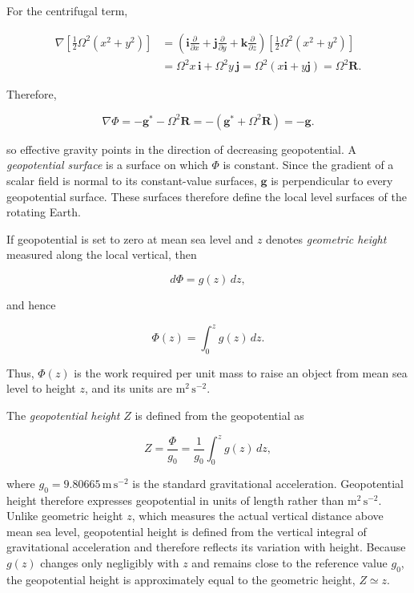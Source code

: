 \documentclass[10pt,twocolumn]{memoir}
\begin{document}
For the centrifugal term,

\begin{equation}
\begin{aligned}
    \nabla\left[\frac{1}{2}\Omega^2(x^2+y^2)\right]
    &= \left(\mathbf{i}\frac{\partial}{\partial x}+\mathbf{j}\frac{\partial}{\partial y}+\mathbf{k}\frac{\partial}{\partial z}\right)
    \left[\frac{1}{2}\Omega^2(x^2+y^2)\right] \\
    &= \Omega^2x\,\mathbf{i}+\Omega^2y\,\mathbf{j}
    = \Omega^2\left(x\mathbf{i}+y\mathbf{j}\right)
    = \Omega^2\mathbf{R}.
\end{aligned}
\end{equation}

Therefore,

\begin{equation}
    \nabla\Phi = -\mathbf{g}^* - \Omega^2\mathbf{R} = -\left(\mathbf{g}^* + \Omega^2\mathbf{R}\right) = -\mathbf{g}.
\end{equation}

so effective gravity points in the direction of decreasing geopotential. A \textit{geopotential surface} is a surface on which $\Phi$ is constant. Since the gradient of a scalar field is normal to its constant-value surfaces, $\mathbf{g}$ is perpendicular to every geopotential surface. These surfaces therefore define the local level surfaces of the rotating Earth.

If geopotential is set to zero at mean sea level and $z$ denotes \textit{geometric height} measured along the local vertical, then

\begin{equation}
    d\Phi = g(z)\,dz,
\end{equation}

and hence

\begin{equation}
    \Phi(z) = \int_0^z g(z)\,dz.
\end{equation}

Thus, $\Phi(z)$ is the work required per unit mass to raise an object from mean sea level to height $z$, and its units are $\mathrm{m^2\,s^{-2}}$.

The \textit{geopotential height} $Z$ is defined from the geopotential as

\begin{equation}
    Z = \frac{\Phi}{g_0} = \frac{1}{g_0} \int_0^z g(z)\,dz,
\end{equation}

where $g_0=9.80665\,\mathrm{m\,s^{-2}}$ is the standard gravitational acceleration. Geopotential height therefore expresses geopotential in units of length rather than $\mathrm{m^2\,s^{-2}}$. Unlike geometric height $z$, which measures the actual vertical distance above mean sea level, geopotential height is defined from the vertical integral of gravitational acceleration and therefore reflects its variation with height. Because $g(z)$ changes only negligibly with $z$ and remains close to the reference value $g_0$, the geopotential height is approximately equal to the geometric height, $Z\simeq z$.
\end{document}
